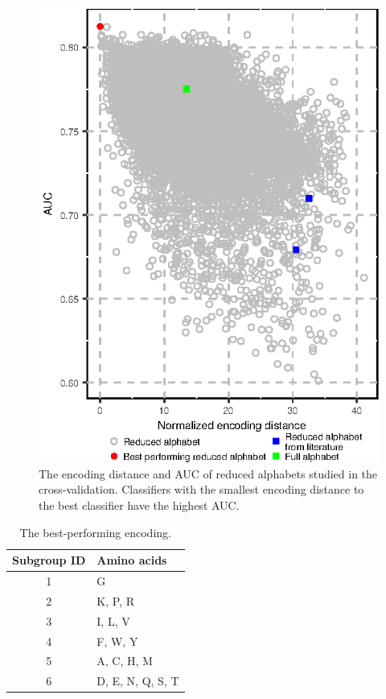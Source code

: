 \documentclass[a4,center,fleqn]{NAR}
\begin{document}
\begin{figure}[!tpb]
\centerline{\includegraphics{figures/ed_AUC.eps}}
\caption{The encoding distance and AUC of reduced alphabets studied in the 
cross-validation. 
Classifiers with the smallest encoding distance to the best classifier have 
the highest AUC.}\label{fig:ed_AUC}
\end{figure}

\begin{table}[ht]
\centering
\caption{The best-performing encoding.} 
\label{tab:best_enc}
\begin{tabular}{cl}
\toprule
Subgroup ID & Amino acids \\ 
\midrule
  1 & G \\ 
\rowcolor[gray]{0.85}  2 & K, P, R \\ 
3 & I, L, V \\ 
\rowcolor[gray]{0.85}  4 & F, W, Y \\ 
5 & A, C, H, M \\ 
\rowcolor[gray]{0.85}  6 & D, E, N, Q, S, T \\ 
\bottomrule
\end{tabular}
\end{table}
\end{document}

